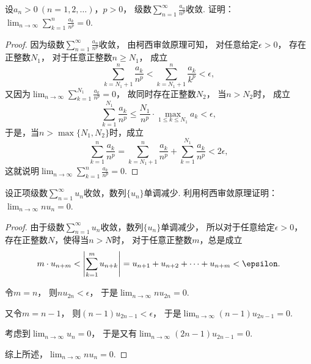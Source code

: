 \begin{example}
设\(a_n>0\ (n=1,2,\dotsc)\)，\(p>0\)，
级数\(\sum_{n=1}^\infty \frac{a_n}{n^p}\)收敛.
证明：\(\lim_{n\to\infty} \sum_{k=1}^n \frac{a_k}{n^p} = 0\).
\begin{proof}
因为级数\(\sum_{n=1}^\infty \frac{a_n}{n^p}\)收敛，
由{柯西审敛原理}可知，
对任意给定\(\epsilon>0\)，
存在正整数\(N_1\)，
对于任意正整数\(n \geq N_1\)，
成立\begin{equation*}
	\sum_{k=N_1+1}^n \frac{a_k}{n^p}
	< \sum_{k=N_1+1}^n \frac{a_k}{k^p}
	< \epsilon,
\end{equation*}
又因为\(\lim_{n\to\infty} \sum_{k=1}^{N_1} \frac{a_k}{n^p} = 0\)，
故同时存在正整数\(N_2\)，
当\(n > N_2\)时，
成立\begin{equation*}
	\sum_{k=1}^{N_1} \frac{a_k}{n^p}
	\leq \frac{N_1}{n^p} \cdot \max_{1 \leq k \leq N_1} a_k
	< \epsilon,
\end{equation*}
于是，当\(n>\max\{N_1,N_2\}\)时，成立\begin{equation*}
	\sum_{k=1}^n \frac{a_k}{n^p}
	= \sum_{k=N_1+1}^n \frac{a_k}{n^p}
	+ \sum_{k=1}^{N_1} \frac{a_k}{n^p}
	< 2\epsilon,
\end{equation*}
这就说明\(\lim_{n\to\infty} \sum_{k=1}^n \frac{a_k}{n^p} = 0\).
\end{proof}
\end{example}

\begin{example}
设正项级数\(\sum_{n=1}^\infty u_n\)收敛，数列\(\{u_n\}\)单调减少.
利用柯西审敛原理证明：\(\lim_{n\to\infty} n u_n = 0\).
\begin{proof}
由于级数\(\sum_{n=1}^\infty u_n\)收敛，数列\(\{u_n\}\)单调减少，
所以对于任意给定\(\epsilon>0\)，
存在正整数\(N\)，使得当\(n>N\)时，
对于任意正整数\(m\)，总是成立\begin{equation*}
	m \cdot u_{n+m}
	< \abs{\sum_{k=1}^m u_{n+k}}
	= u_{n+1} + u_{n+2} + \dotsb + u_{n+m}
	< \epsilon.
\end{equation*}

令\(m=n\)，
则\(n u_{2n} < \epsilon\)，
于是\(\lim_{n\to\infty} n u_{2n} = 0\).

又令\(m=n-1\)，
则\((n-1) u_{2n-1} < \epsilon\)，
于是\(\lim_{n\to\infty} (n-1) u_{2n-1} = 0\).

考虑到\(\lim_{n\to\infty} u_n = 0\)，
于是又有\(\lim_{n\to\infty} (2n-1) u_{2n-1} = 0\).

综上所述，\(\lim_{n\to\infty} n u_n = 0\).
\end{proof}
\end{example}
